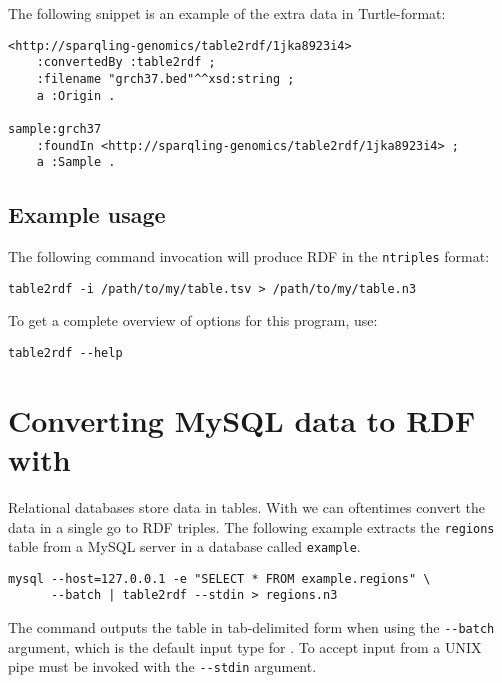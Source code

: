   The following snippet is an example of the extra data in Turtle-format:

\begin{siderules}
\begin{verbatim}
<http://sparqling-genomics/table2rdf/1jka8923i4>
    :convertedBy :table2rdf ;
    :filename "grch37.bed"^^xsd:string ;
    a :Origin .

sample:grch37
    :foundIn <http://sparqling-genomics/table2rdf/1jka8923i4> ;
    a :Sample .
\end{verbatim}
\end{siderules}

\subsection{Example usage}

The following command invocation will produce RDF in the \texttt{ntriples}
format:
\begin{siderules}
\begin{verbatim}
table2rdf -i /path/to/my/table.tsv > /path/to/my/table.n3
\end{verbatim}
\end{siderules}

To get a complete overview of options for this program, use:
\begin{siderules}
\begin{verbatim}
table2rdf --help
\end{verbatim}
\end{siderules}

\section{Converting MySQL data to RDF with }

  Relational databases store data in tables.  With  we
  can oftentimes convert the data in a single go to RDF triples.  The following
  example extracts the \texttt{regions} table from a MySQL server in a database
  called \texttt{example}.

\begin{siderules}
\begin{verbatim}
mysql --host=127.0.0.1 -e "SELECT * FROM example.regions" \
      --batch | table2rdf --stdin > regions.n3
\end{verbatim}
\end{siderules}

  The  command outputs the table in tab-delimited form when using
  the \texttt{-{}-batch} argument, which is the default input type for
  .  To accept input from a UNIX pipe \program{table2rdf} must
  be invoked with the \texttt{-{}-stdin} argument.

